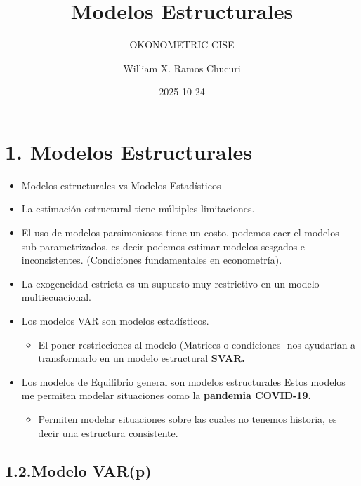 \documentclass[
  spanish,
  letterpaper,
  DIV=11,
  numbers=noendperiod]{scrartcl}
\title{Modelos Estructurales}
\subtitle{OKONOMETRIC CISE}
\author{William X. Ramos Chucuri}
\date{2025-10-24}
\providecommand{\tightlist}{%
  \setlength{\itemsep}{0pt}\setlength{\parskip}{0pt}}
\renewcommand*\contentsname{Tabla de contenidos}
\newcommand\contentsname{Tabla de contenidos}
\begin{document}
\maketitle

\renewcommand*\contentsname{Tabla de contenidos}
{
\hypersetup{linkcolor=}
\setcounter{tocdepth}{3}
\tableofcontents
}

\section{\texorpdfstring{\textbf{1. Modelos
Estructurales}}{1. Modelos Estructurales}}\label{modelos-estructurales}

\begin{itemize}
\item
  Modelos estructurales vs Modelos Estadísticos
\item
  La estimación estructural tiene múltiples limitaciones.
\item
  El uso de modelos parsimoniosos tiene un costo, podemos caer el
  modelos sub-parametrizados, es decir podemos estimar modelos sesgados
  e inconsistentes. (Condiciones fundamentales en econometría).
\item
  La exogeneidad estricta es un supuesto muy restrictivo en un modelo
  multiecuacional.
\item
  Los modelos VAR son modelos estadísticos.

  \begin{itemize}
  \tightlist
  \item
    El poner restricciones al modelo (Matrices o condiciones- nos
    ayudarían a transformarlo en un modelo estructural \textbf{SVAR.}
  \end{itemize}
\item
  Los modelos de Equilibrio general son modelos estructurales \textbar{}
  Estos modelos me permiten modelar situaciones como la \textbf{pandemia
  COVID-19.}

  \begin{itemize}
  \tightlist
  \item
    Permiten modelar situaciones sobre las cuales no tenemos historia,
    es decir una estructura consistente.
  \end{itemize}
\end{itemize}

\subsection{1.2.Modelo VAR(p)}\label{modelo-varp}
\end{document}
